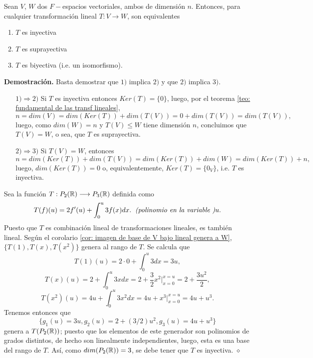 \begin{teo}
	\label{teo: inyectiva sii supra sii biyect en dim finita}
Sean $V$, $W$ dos $F-$espacios vectoriales, ambos de dimensión
$n$. Entonces, para cualquier transformación lineal
$T: V \longrightarrow W$, son equivalentes
\begin{enumerate}
	\item $T$ es inyectiva
	\item $T$ es suprayectiva
	\item $T$ es biyectiva (i.e. un isomorfismo).
\end{enumerate}
\end{teo}
\noindent
\textbf{Demostración.}
Basta demostrar que $1)$ implica $2)$ y que
$2)$ implica $3)$.
\begin{itemize}
	\item[$1) \Rightarrow 2)$] Si $T$ es inyectiva entonces
	$Ker(T) = \{ 0 \}$, luego, por el teorema 
	\ref{teo: fundamental de las transf lineales},
	\[
	n = dim(V) = dim(Ker(T)) + dim(T(V)) = 0 + dim(T(V)) =
	dim(T(V)),
	\]
	luego, como $dim(W) = n$ y $T(V) \leq W$ tiene dimensión $n$,
	concluimos que $T(V) = W$, o sea, que $T$ es suprayectiva.
	\item[$2) \Rightarrow 3)$] Si $T(V) = W$, entonces
	\[
	n = dim(Ker(T)) + dim(T(V)) = dim(Ker(T)) + dim(W)
	= dim(Ker(T)) + n,
	\]
	luego, $dim(Ker(T)) = 0$ o, equivalentemente, 
	$Ker(T) = \{ 0_{V} \}$, i.e. $T$ es inyectiva.
\end{itemize}
\QEDB
\vspace{0.2cm}
\begin{ejem}
Sea la función $T: P_{2}(\mathbb{R}) \longrightarrow P_{3}(\mathbb{R})$
definida como
\[
T(f)(u) = 2 f'(u) + \int_{0}^{u} 3f(x) dx.
\hspace{0.2cm} \textit{(polinomio en la variable )} u. 
\]
Puesto que $T$ es combinación lineal de transformaciones lineales,
es también lineal. Según el corolario 
\ref{cor: imagen de base de V bajo lineal genera a W},
$\{ T(1), T(x), T(x^{2}) \}$ genera al rango de $T$. Se calcula que
\[
T(1)(u) = 2 \cdot 0 + \int_{0}^{u} 3 dx = 3u,
\]
\[
T(x)(u) = 2 + \int_{0}^{u} 3x dx = 2 + \frac{3}{2}x^{2} \Bigg|_{x=0}^{x=u}
= 2 + \frac{3u^{2}}{2},
\]
\[
T(x^{2})(u) = 4u + \int_{0}^{u} 3x^{2}dx = 
4u + x^{3} \Bigg|_{x=0}^{x=u} = 4u + u^{3}.
\]
Tenemos entonces que 
\[
\{ g_{1}(u) = 3u, g_{2}(u) = 2 + (3/2)u^{2}, g_{3}(u) = 4u + u^{3}  \}
\]
genera a $T(P_{2}(\mathbb{R}))$; puesto que los elementos de este generador
son polinomios de grados distintos, de hecho son linealmente independientes,
luego, esta es una base del rango de $T$. Así, como
$dim(P_{2}(\mathbb{R})) = 3$, se debe tener que $T$ es inyectiva.
$\diamond$
\end{ejem}

